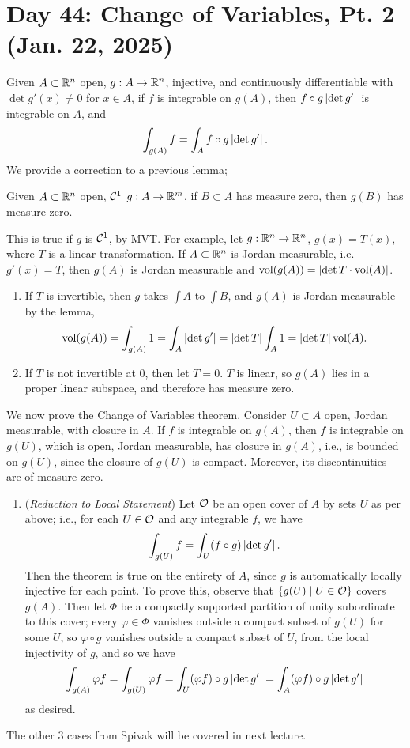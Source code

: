 \section{Day 44: Change of Variables, Pt. 2 (Jan. 22, 2025)}
Given $A \subset \mathbb R^n$ open, $g : A \to \mathbb R^n$, injective, and continuously differentiable with $\det g'(x) \neq 0$ for $x \in A$, if $f$ is integrable on $g(A)$, then $f \circ g \left\lvert \det g' \right\rvert$ is integrable on $A$, and
\[ \int_{g(A)} f = \int_A f \circ g \left\lvert \det g' \right\rvert. \]
We provide a correction to a previous lemma;
\begin{simplelemma}
    Given $A \subset \mathbb R^n$ open, $\mathcal C^1$ $g : A \to \mathbb R^m$, if $B \subset A$ has measure zero, then $g(B)$ has measure zero.
\end{simplelemma}
\noindent This is true if $g$ is $\mathcal C^1$, by MVT.
\medskip\newline
For example, let $g : \mathbb R^n \to \mathbb R^n$, $g(x) = T(x)$, where $T$ is a linear transformation. If $A \subset \mathbb R^n$ is Jordan measurable, i.e. $g'(x) = T$, then $g(A)$ is Jordan measurable and $\mathrm{vol}(g(A)) = \left\lvert \det T \cdot \mathrm{vol}(A) \right\rvert$.
\begin{enumerate}[label=(\roman*)]
    \item If $T$ is invertible, then $g$ takes $\int A$ to $\int B$, and $g(A)$ is Jordan measurable by the lemma,
    \[ \mathrm{vol}(g(A)) = \int_{g(A)} 1 = \int_A \left\lvert \det g' \right\rvert = \left\lvert \det T \right\rvert \int_A 1 = \left\lvert \det T \right\rvert \mathrm{vol}(A). \]
    \item If $T$ is not invertible at $0$, then let $T = 0$. $T$ is linear, so $g(A)$ lies in a proper linear subspace, and therefore has measure zero.
\end{enumerate}
We now prove the Change of Variables theorem. Consider $U \subset A$ open, Jordan measurable, with closure in $A$. If $f$ is integrable on $g(A)$, then $f$ is integrable on $g(U)$, which is open, Jordan measurable, has closure in $g(A)$, i.e., is bounded on $g(U)$, since the closure of $g(U)$ is compact. Moreover, its discontinuities are of measure zero.
\begin{enumerate}[label=(\roman*)]
    \item (\textit{Reduction to Local Statement}) Let $\mathcal O$ be an open cover of $A$ by sets $U$ as per above; i.e., for each $U \in \mathcal O$ and any integrable $f$, we have
    \[ \int_{g(U)} f = \int_U (f \circ g) \left\lvert \det g' \right\rvert. \]
    Then the theorem is true on the entirety of $A$, since $g$ is automatically locally injective for each point. To prove this, observe that $\{g(U) \mid U \in \mathcal O\}$ covers $g(A)$. Then let $\Phi$ be a compactly supported partition of unity subordinate to this cover; every $\varphi \in \Phi$ vanishes outside a compact subset of $g(U)$ for some $U$, so $\varphi \circ g$ vanishes outside a compact subset of $U$, from the local injectivity of $g$, and so we have
    \[ \int_{g(A)} \varphi f = \int_{g(U)} \varphi f = \int_U (\varphi f) \circ g \left\lvert \det g' \right\rvert = \int_A (\varphi f) \circ g \left\lvert \det g' \right\rvert \]
    as desired.
\end{enumerate}
The other $3$ cases from Spivak will be covered in next lecture.